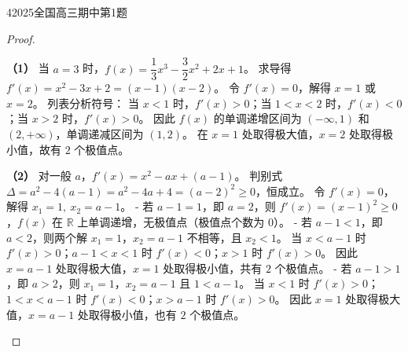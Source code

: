 \documentclass[
showanswers,        %
answercolor=red,    %
paper=a4,           %
sectioncolor=cyan,  %
subsectioncolor=cyan,
exercisecolor=orange, %
examplecolor=cyan,    %
bianshicolor=purple   %
]{biscuits}
\begin{document}
\begin{example}{4}{2025}{全国}{高三}{期中}{第1题}
\begin{choices}
		\end{choices}
		\begin{proof}
			\begin{answer}
				\noindent\textbf{（1）} 当 $a=3$ 时，$f(x)=\dfrac{1}{3}x^3-\dfrac{3}{2}x^2+2x+1$。  
				求导得 $f'(x)=x^2-3x+2=(x-1)(x-2)$。  
				令 $f'(x)=0$，解得 $x=1$ 或 $x=2$。  
				列表分析符号：  
				当 $x<1$ 时，$f'(x)>0$；当 $1<x<2$ 时，$f'(x)<0$；当 $x>2$ 时，$f'(x)>0$。  
				因此 $f(x)$ 的单调递增区间为 $(-\infty,1)$ 和 $(2,+\infty)$，单调递减区间为 $(1,2)$。  
				在 $x=1$ 处取得极大值，$x=2$ 处取得极小值，故有 $2$ 个极值点。  
				
				\noindent\textbf{（2）} 对一般 $a$，$f'(x)=x^2-ax+(a-1)$。  
				判别式 $\Delta = a^2-4(a-1)=a^2-4a+4=(a-2)^2 \ge 0$，恒成立。  
				令 $f'(x)=0$，解得 $x_1=1,\ x_2=a-1$。  
				- 若 $a-1 = 1$，即 $a=2$，则 $f'(x)=(x-1)^2\ge 0$，$f(x)$ 在 $\mathbb{R}$ 上单调递增，无极值点（极值点个数为 $0$）。  
				- 若 $a-1 < 1$，即 $a<2$，则两个解 $x_1=1$，$x_2=a-1$ 不相等，且 $x_2<1$。  
				当 $x<a-1$ 时 $f'(x)>0$；$a-1<x<1$ 时 $f'(x)<0$；$x>1$ 时 $f'(x)>0$。  
				因此 $x=a-1$ 处取得极大值，$x=1$ 处取得极小值，共有 $2$ 个极值点。  
				- 若 $a-1 > 1$，即 $a>2$，则 $x_1=1$，$x_2=a-1$ 且 $1<a-1$。  
				当 $x<1$ 时 $f'(x)>0$；$1<x<a-1$ 时 $f'(x)<0$；$x>a-1$ 时 $f'(x)>0$。  
				因此 $x=1$ 处取得极大值，$x=a-1$ 处取得极小值，也有 $2$ 个极值点。  
				

\end{answer}
\end{proof}
\end{example}
\end{document}
